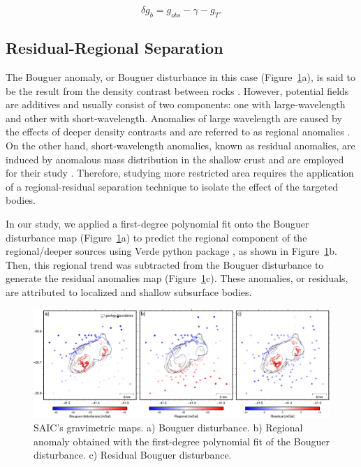 \begin{equation}
{
\delta g_{b} = g_{obs} - \gamma - g_T}.
\end{equation}

\subsection{Residual-Regional Separation}

The Bouguer anomaly, or Bouguer disturbance in this case (Figure~\ref{gravity}a), is said to be the result from the density contrast between rocks \citep{Amelio1997}. However, potential fields are additives and usually consist of two components: one with large-wavelength and other with short-wavelength. Anomalies of large wavelength are caused by the effects of deeper density contrasts and are referred to as regional anomalies \citep{Telford1990}. On the other hand, short-wavelength anomalies, known as residual anomalies, are induced by anomalous mass distribution in the shallow crust and are employed for their study \citep{Lowrie1997}. Therefore, studying more restricted area requires the application of a regional-residual separation technique to isolate the effect of the targeted bodies. 

In our study, we applied a first-degree polynomial fit onto the Bouguer disturbance map (Figure~\ref{gravity}a) to predict the regional component of the regional/deeper sources using Verde python package \citep{verde2018}, as shown in Figure~\ref{gravity}b. Then, this regional trend was subtracted from the Bouguer disturbance to generate the residual anomalies map (Figure~\ref{gravity}c).
These anomalies, or residuals, are attributed to localized and shallow subsurface bodies.

\begin{figure}[H]
  \centering
  \includegraphics[width=1\linewidth]{figures/gravity.png}
  \caption{
    SAIC's gravimetric maps. a) Bouguer disturbance. b) Regional anomaly obtained with the first-degree polynomial fit of the Bouguer disturbance. c) Residual Bouguer disturbance.
      }
  \label{gravity}
\end{figure}


